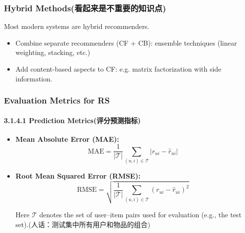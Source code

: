 \documentclass[UTF8]{ctexart}
\begin{document}
\subsubsection{Hybrid Methods(看起来是不重要的知识点)}
Most modern systems are hybrid recommenders.
    \begin{itemize}
        \item Combine separate recommenders (CF + CB): ensemble techniques (linear weighting, stacking, etc.)
        \item Add content-based aspects to CF: e.g. matrix factorization with side information.
    \end{itemize}

\subsubsection{Evaluation Metrics for RS}
   \paragraph{3.1.4.1 Prediction Metrics(评分预测指标)}
    \begin{itemize}
        \item \textbf{Mean Absolute Error (MAE):}
        \[\text{MAE} = \frac{1}{|\mathcal{T}|} \sum_{(u,i) \in \mathcal{T}} |r_{ui} - \hat{r}_{ui}|\]
        
        \item \textbf{Root Mean Squared Error (RMSE):}
        \[\text{RMSE} = \sqrt{\frac{1}{|\mathcal{T}|} \sum_{(u,i) \in \mathcal{T}} (r_{ui} - \hat{r}_{ui})^2}\]
        
        Here $\mathcal{T}$ denotes the set of user--item pairs used for evaluation (e.g., the test set).(人话：测试集中所有用户和物品的组合)
    \end{itemize}
\end{document}
